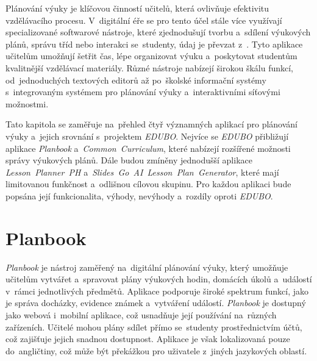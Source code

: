 \documentclass[male,czech,api_bc]{kitheses}
\begin{document}
Plánování výuky je klíčovou činností učitelů, která ovlivňuje efektivitu vzdělávacího procesu. V~digitální éře se pro tento účel stále více využívají specializované softwarové nástroje, které zjednodušují tvorbu a~sdílení výukových plánů, správu tříd nebo interakci se~studenty, údaj je převzat z~\cite{UnescoIIEP}. Tyto aplikace učitelům umožňují šetřit čas, lépe organizovat výuku a~poskytovat studentům kvalitnější vzdělávací materiály. Různé nástroje nabízejí širokou škálu funkcí, od~jednoduchých textových editorů až po~školské informační systémy s~integrovaným systémem pro plánování výuky a~interaktivními síťovými možnostmi.

Tato kapitola se zaměřuje na~přehled čtyř významných aplikací pro plánování výuky a~jejich srovnání s~projektem \textit{EDUBO}. Nejvíce se \textit{EDUBO} přibližují aplikace \textit{Planbook} a~\textit{Common~Curriculum}, které nabízejí rozšířené možnosti správy výukových plánů. Dále budou zmíněny jednodušší aplikace \textit{Lesson~Planner~PH} a~\textit{Slides~Go~AI~Lesson~Plan~Generator}, které mají limitovanou funkčnost a~odlišnou cílovou skupinu. Pro každou aplikaci bude popsána její funkcionalita, výhody, nevýhody a~rozdíly oproti \textit{EDUBO}.

\section{Planbook}

\textit{Planbook} je nástroj zaměřený na~digitální plánování výuky, který umožňuje učitelům vytvářet a~spravovat plány výukových hodin, domácích úkolů a~událostí v~rámci jednotlivých předmětů. Aplikace podporuje široké spektrum funkcí, jako je správa docházky, evidence známek a~vytváření událostí. \textit{Planbook} je dostupný jako webová i~mobilní aplikace, což usnadňuje její používání na~různých zařízeních. Učitelé mohou plány sdílet přímo se~studenty prostřednictvím účtů, což zajišťuje jejich snadnou dostupnost. Aplikace je však lokalizovaná pouze do~angličtiny, což může být překážkou pro uživatele z~jiných jazykových oblastí.
\end{document}
